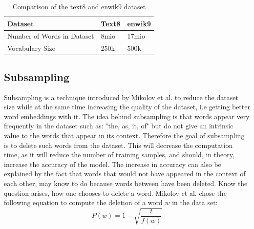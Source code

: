 \begin{table}[]
\centering
\begin{tabular}{|l|l|l|}
\hline
Dataset                    & Text8 & enwik9 \\ \hline
Number of Words in Dataset & 8mio  & 17mio  \\ \hline
Vocabulary Size            & 250k  & 500k   \\ \hline
\end{tabular}
\caption{Comparison of the text8 and enwik9 dataset}
    \label{table:t8_e9_comp}
\end{table}
 
 
\subsection{Subsampling}
Subsampling is a technique introduced by Mikolov et al. \cite{mikolov} to reduce the dataset size while at the same time increasing the quality of the dataset, i.e getting better word embeddings with it. The idea behind subsampling is that words appear very frequently in the dataset such as: "the, as, it, of" but do not give an intrinsic value to the words that appear in its context. Therefore the goal of subsampling is to delete such words from the dataset. This will decrease the computation time, as it will reduce the number of training samples, and should, in theory, increase the accuracy of the model. The increase in accuracy can also be explained by the fact that words that would not have appeared in the context of each other, may know to do because words between have been deleted.
Know the question arises, how one chooses to delete a word. Mikolov et al. chose the following equation to compute the deletion of a word $w$ in the data set:
\begin{equation} \label{eq:sampling}
P(w) = 1- \sqrt{{\frac{t}{f(w)}}}
\end{equation}

